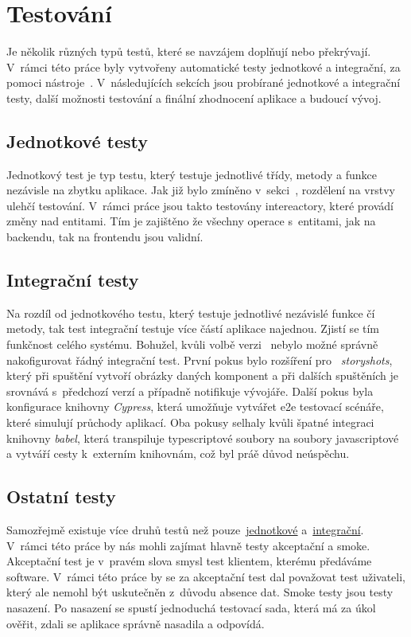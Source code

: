 \chapter{Testování}
\label{ch:testing}
Je několik různých typů testů, které se navzájem doplňují nebo překrývají. V~rámci této práce byly vytvořeny automatické testy jednotkové a integrační, za pomoci nástroje~. V~následujících sekcích jsou probírané jednotkové a integrační testy, další možnosti testování a finální zhodnocení aplikace a budoucí vývoj.

\section{Jednotkové testy}
\label{sc:unit_tests}
Jednotkový test je typ testu, který testuje jednotlivé třídy, metody a funkce nezávisle na zbytku aplikace. Jak již bylo zmíněno v~sekci~, rozdělení na vrstvy ulehčí testování. V~rámci práce jsou takto testovány intereactory, které provádí změny nad entitami. Tím je zajištěno že všechny operace s~entitami, jak na backendu, tak na frontendu jsou validní.

\section{Integrační testy}
\label{sc:integration_tests}
Na rozdíl od jednotkového testu, který testuje jednotlivé nezávislé funkce čí metody, tak test integrační testuje více částí aplikace najednou. Zjistí se tím funkčnost celého systému. Bohužel, kvůli volbě verzi~ nebylo možné správně nakofigurovat řádný integrační test. První pokus bylo rozšíření pro~ \emph{storyshots}, který při spuštění vytvoří obrázky daných komponent a při dalších spuštěních je srovnává s~předchozí verzí a případně notifikuje vývojáře. Další pokus byla konfigurace knihovny \emph{Cypress}, která umožňuje vytvářet \acrfull{e2e} testovací scénáře, které simulují průchody aplikací. Oba pokusy selhaly kvůli špatné integraci knihovny \emph{babel}, která transpiluje typescriptové soubory na soubory javascriptové a vytváří cesty k~externím knihovnám, což byl práě důvod neúspěchu.

\section{Ostatní testy}
Samozřejmě existuje více druhů testů než pouze~\hyperref[sc:unit_tests]{jednotkové} a~\hyperref[sc:integration_tests]{integrační}. V~rámci této práce by nás mohli zajímat hlavně testy akceptační a smoke. Akceptační test je v~pravém slova smysl test klientem, kterému předáváme software. V~rámci této práce by se za akceptační test dal považovat test uživateli, který ale nemohl být uskutečněn z~důvodu absence dat. Smoke testy jsou testy nasazení. Po nasazení se spustí jednoduchá testovací sada, která má za úkol ověřit, zdali se aplikace správně nasadila a odpovídá.

